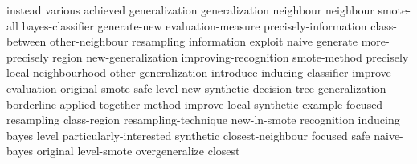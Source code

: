 instead	
various	
achieved	
generalization	generalization	
neighbour	neighbour	
smote-all	
bayes-classifier	
generate-new	
evaluation-measure	
precisely-information	
class-between	
other-neighbour	
resampling	
information	
exploit	
naive	
generate	
more-precisely	
region	
new-generalization	
improving-recognition	
smote-method	
precisely	
local-neighbourhood	
other-generalization	
introduce	
inducing-classifier	
improve-evaluation	
original-smote	
safe-level	
new-synthetic	
decision-tree	
generalization-borderline	
applied-together	
method-improve	
local	
synthetic-example	
focused-resampling	
class-region	
resampling-technique	
new-ln-smote	
recognition	
inducing	
bayes	
level	
particularly-interested	
synthetic	
closest-neighbour	
focused	
safe	
naive-bayes	
original	
level-smote	
overgeneralize	
closest	
